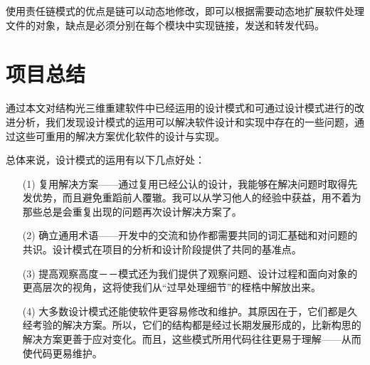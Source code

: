 \documentclass[article]{BJTU-thesis}
\begin{document}
	使用责任链模式的优点是链可以动态地修改，即可以根据需要动态地扩展软件处理文件的对象，缺点是必须分别在每个模块中实现链接，发送和转发代码。
	
	\section{项目总结}
	通过本文对结构光三维重建软件中已经运用的设计模式和可通过设计模式进行的改进分析，我们发现设计模式的运用可以解决软件设计和实现中存在的一些问题，通过这些可重用的解决方案优化软件的设计与实现。
	
	总体来说，设计模式的运用有以下几点好处：
	\begin{enumerate}
	\item[(1)] 复用解决方案——通过复用已经公认的设计，我能够在解决问题时取得先发优势，而且避免重蹈前人覆辙。我可以从学习他人的经验中获益，用不着为那些总是会重复出现的问题再次设计解决方案了。
	
	\item[(2)] 确立通用术语——开发中的交流和协作都需要共同的词汇基础和对问题的共识。设计模式在项目的分析和设计阶段提供了共同的基准点。
	
	\item[(3)] 提高观察高度－－模式还为我们提供了观察问题、设计过程和面向对象的更高层次的视角，这将使我们从“过早处理细节”的桎梏中解放出来。
	
	\item[(4)] 大多数设计模式还能使软件更容易修改和维护。其原因在于，它们都是久经考验的解决方案。所以，它们的结构都是经过长期发展形成的，比新构思的解决方案更善于应对变化。而且，这些模式所用代码往往更易于理解——从而使代码更易维护。
	\end{enumerate}

	
	
	
\end{document}
